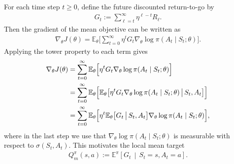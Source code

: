 For each time step $t\ge 0$, define the future discounted return-to-go by
\begin{align}
    G_t := \sum_{\ell=t}^{\infty}\eta^{\ell-t}R_\ell.
\end{align}
Then the gradient of the mean objective can be written as
\begin{align}
    \nabla_{\theta}J(\theta)
    =
    \mathbb{E}_{\theta}\Biggl[
        \sum_{t=0}^{\infty}
        \eta^t G_t
        \nabla_{\theta}\log\pi(A_t\mid S_t;\theta)
    \Biggr].
\end{align}
Applying the tower property to each term gives
\begin{align}
    \nabla_{\theta}J(\theta)
    &=
    \sum_{t=0}^{\infty}
    \mathbb{E}_{\theta}\Bigl[
        \eta^t G_t
        \nabla_{\theta}\log\pi(A_t\mid S_t;\theta)
    \Bigr] \label{eq:mean_local_1}\\
    &=
    \sum_{t=0}^{\infty}
    \mathbb{E}_{\theta}\Bigl[
        \mathbb{E}_{\theta}\bigl[
            \eta^t G_t
            \nabla_{\theta}\log\pi(A_t\mid S_t;\theta)
            \,\big|\,
            S_t,A_t
        \bigr]
    \Bigr] \label{eq:mean_local_2}\\
    &=
    \sum_{t=0}^{\infty}
    \mathbb{E}_{\theta}\Bigl[
        \eta^t
        \mathbb{E}_{\theta}\bigl[
            G_t
            \,\big|\,
            S_t,A_t
        \bigr]
        \nabla_{\theta}\log\pi(A_t\mid S_t;\theta)
    \Bigr], \label{eq:mean_local_3}
\end{align}
where in the last step we use that $\nabla_{\theta}\log\pi(A_t\mid S_t;\theta)$ is measurable with respect to $\sigma(S_t,A_t)$. This motivates the local mean target
\begin{align}
    Q_m^{\pi}(s,a)
    :=
    \mathbb{E}^{\pi}\!\left[
        G_t
        \,\middle|\,
        S_t=s,A_t=a
    \right].
\end{align}

